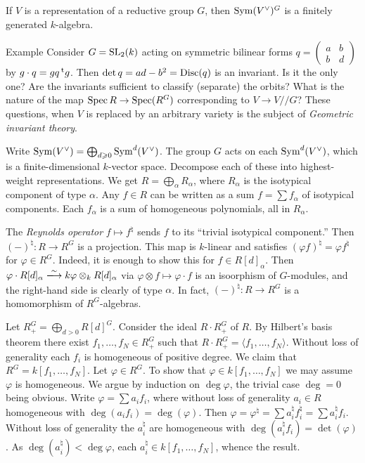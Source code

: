 \begin{theo}[Hilbert]
If $V$ is a representation of a reductive group $G$, then 
$\operatorname{Sym}(V^\vee)^G$ is a finitely generated $k$-algebra. 
\end{theo}

\begin{enonce}[remark]{Example}
Consider $G=\operatorname{SL}_2(k)$ acting on symmetric bilinear forms 
$q=\begin{pmatrix} a & b \\ b & d\end{pmatrix}$ by 
$g\cdot q = g q \prescript{\mathrm{t}}{}{g}$. Then $\det q=a d-b^2=\operatorname{Disc}(q)$ is an 
invariant. Is it the only one? Are the invariants sufficient to classify 
(separate) the orbits? What is the nature of the map 
$\operatorname{Spec} R \to \operatorname{Spec}(R^G)$ corresponding to 
$V\to V/\!\!\! / G$? These questions, when $V$ is replaced by an arbitrary 
variety is the subject of \emph{Geometric invariant theory}. 
\end{enonce}

Write $\operatorname{Sym}(V^\vee) = \bigoplus_{d\geqslant 0} \operatorname{Sym}^d(V^\vee)$. 
The group $G$ acts on each $\operatorname{Sym}^d(V^\vee)$, which is a finite-dimensional 
$k$-vector space. Decompose each of these into highest-weight representations. 
We get $R=\bigoplus_\alpha R_\alpha$, where $R_\alpha$ is the isotypical component 
of type $\alpha$. Any $f\in R$ can be written as a sum 
$f=\sum f_\alpha$ of isotypical components. Each $f_\alpha$ is a sum of 
homogeneous polynomials, all in $R_\alpha$. 

The \emph{Reynolds operator} $f\mapsto f^\natural$ sends $f$ to its ``trivial 
isotypical component.'' Then $(-)^\natural:R\to R^G$ is a projection. This map is 
$k$-linear and satisfies $(\varphi f)^\natural = \varphi f^\natural$ for 
$\varphi\in R^G$. Indeed, it is enough to show this for $f\in R[d]_\alpha$. 
Then 
$\varphi\cdot R[d]_\alpha \iso k\varphi\otimes_k R[d]_\alpha$ via 
$\varphi\otimes f\mapsto \varphi\cdot f$ is an isoorphism of 
$G$-modules, and the right-hand side is clearly of type $\alpha$. In fact, 
$(-)^\natural:R\to R^G$ is a homomorphism of $R^G$-algebras. 

Let $R_+^G=\bigoplus_{d>0} R[d]^G$. Consider the ideal 
$R\cdot R_+^G$ of $R$. By Hilbert's basis theorem there exist 
$f_1,\dots,f_N\in R_+^G$ such that 
$R\cdot R_+^G = \langle f_1,\dots,f_N\rangle$. Without loss of generality 
each $f_i$ is homogeneous of positive degree. We claim that 
$R^G=k[f_1,\dots,f_N]$. Let $\varphi\in R^G$. To show that 
$\varphi\in k[f_1,\dots,f_N]$ we may assume $\varphi$ is homogeneous. We 
argue by induction on $\deg\varphi$, the trivial case $\deg=0$ being 
obvious. Write $\varphi=\sum a_i f_i$, where without loss of generality 
$a_i\in R$ homogeneous with $\deg(a_i f_i) = \deg(\varphi)$. 
Then 
$\varphi=\varphi^\natural = \sum a_i^\natural f_i^\natural = \sum a_i^\natural f_i$. 
Without loss of generality the $a_i^\natural$ are homogeneous with 
$\deg(a_i^\natural f_i) = \det(\varphi)$. As 
$\deg(a_i^\natural)<\deg\varphi$, each $a_i^\natural\in k[f_1,\dots,f_N]$, 
whence the result. 

